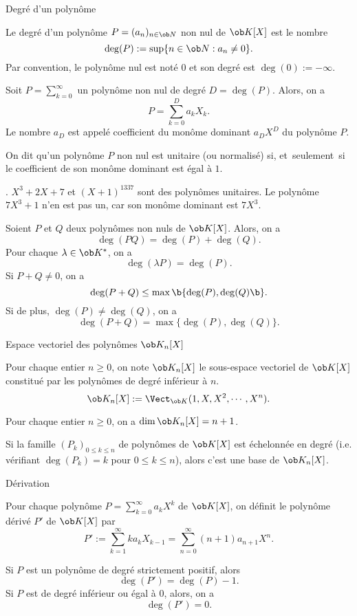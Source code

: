 \Concept [] Degré d'un polynôme


\Definition []  Le degré d'un polynôme $P=(a_n)_{n\in\ob N}$ non nul de $\ob K[X]$ est le nombre
$$
\deg(P):=\sup\{n\in\ob N:a_n\neq0\}.
$$
Par convention, le polynôme nul est noté $0$ et son degré est $\deg(0):=-\infty$. 
\bigskip

\Definition []  Soit $P=\sum_{k=0}^\infty$ un polynôme non nul de degré $D=\deg(P)$. Alors, on a 
$$
P=\sum_{k=0}^Da_kX_k.
$$
Le nombre $a_D$ est appelé coefficient du monôme dominant $a_DX^D$ du polynôme $P$. 
\bigskip

\Definition []  On dit qu'un polynôme $P$ non nul est unitaire (ou normalisé) si, et~seulement~si le coefficient de son monôme dominant est égal à $1$. 
\bigskip

\Exemple. $X^3+2X+7$ et $(X+1)^{1337}$ sont des polynômes unitaires. Le polynôme $7X^3+1$ n'en est pas un, car son monôme dominant est $7X^3$. 
\bigskip

 
\Propriete []  Soient $P$ et $Q$ deux polynômes non nuls de $\ob K[X]$. Alors, on a 
$$
\deg(PQ)=\deg(P)+\deg(Q).
$$
Pour chaque $\lambda\in\ob K^*$, on a 
$$
\deg(\lambda P)=\deg(P).
$$
Si $P+Q\neq0$, on a 
$$
\deg(P+Q)\le\max\b\{\deg(P),\deg(Q)\b\}.
$$
Si de plus, $\deg(P)\neq\deg(Q)$, on a 
$$
\deg(P+Q)=\max\{\deg(P),\deg(Q)\}.
$$

\Concept [] Espace vectoriel des polynômes $\ob K_n[X]$ 


\Definition []  Pour chaque entier $n\ge0$, on note $\ob K_n[X]$ le sous-espace vectoriel de $\ob K[X]$ constitué par les polynômes de degré inférieur à $n$. 
$$
\ob K_n[X]:=\Vect_{\ob K}(1,X,X^2,\cdots,X^n).
$$

\Propriete []  Pour chaque entier $n\ge0$, on a $\dim\ob K_n[X]=n+1$. 
\bigskip

\Propriete []  Si la famille $(P_k)_{0\le k\le n}$ de polynômes de $\ob K[X]$ est échelonnée en degré (i.e. vérifiant $\deg(P_k)=k$ pour $0\le k\le n$), alors 
c'est une base de $\ob K_n[X]$. 

\Concept [] Dérivation


\Definition []  Pour chaque polynôme $P=\sum_{k=0}^\infty a_kX^k$ de $\ob K[X]$, on définit le polynôme dérivé $P'$ de $\ob K[X]$ par 
$$
P':=\sum_{k=1}^\infty ka_kX_{k-1}=\sum_{n=0}^\infty(n+1)a_{n+1}X^n.
$$

\Propriete []  Si $P$ est un polynôme de degré strictement positif, alors
$$
\deg(P')=\deg(P)-1.
$$
Si $P$ est de degré inférieur ou égal à $0$, alors, on a 
$$
\deg(P')=0.
$$

